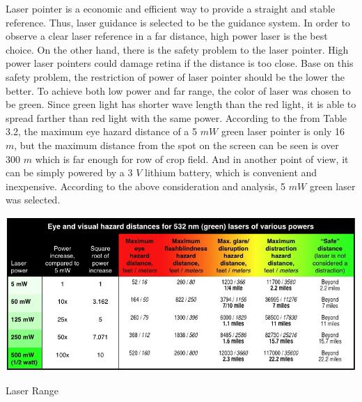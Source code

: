 \documentclass[letterpaper,12pt,oneside]{book}
\begin{document}
		Laser pointer is a economic and efficient way to provide a straight and stable reference. Thus, laser guidance is selected to be the guidance system. In order to observe a clear laser reference in a far distance, high power laser is the best choice. On the other hand, there is the safety problem to the laser pointer. High power laser pointers could damage retina if the distance is too close. Base on this safety problem, the restriction of power of laser pointer should be the lower the better. To achieve both low power and far range, the color of laser was chosen to be green. Since green light has shorter wave length than the red light, it is able to spread farther than red light with the same power. According to the from Table 3.2, the maximum eye hazard distance of a 5 $mW$ green laser pointer is only 16 $m$, but the maximum distance from the spot on the screen can be seen is over 300 $m$ which is far enough for row of crop field. And in another point of view, it can be simply powered by a 3 $V$ lithium battery, which is convenient and inexpensive. According to the above consideration and analysis, 5 $mW$ green laser was selected.
		\begin{table}[ht!]
			\begin{center}
				\includegraphics[scale = 0.5]{laserrange.jpg}
				\caption{Laser Range}
			\end{center}
		\end{table}
		
\end{document}
